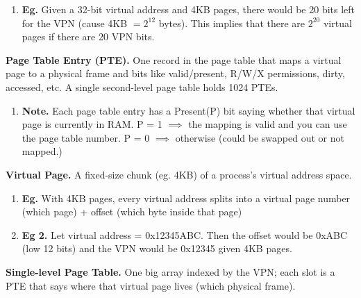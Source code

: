 \documentclass[12pt]{article}
\begin{document}
    \begin{enumerate}
        \item[]{\bf Eg.} {Given a 32-bit virtual address and 4KB pages, there would be 20 bits left for the VPN (cause 4KB $= 2^{12}$ bytes). This implies that there are $2^{20}$ virtual pages if there are 20 VPN bits.} \par 
    \end{enumerate}
    \vspace{1em}

    \setlength{\parindent}{0pt} 
    {\bf Page Table Entry (PTE).} {One record in the page table that maps a virtual page to a physical frame and bits like valid/present, R/W/X permissions, dirty, accessed, etc. A single second-level page table holds 1024 PTEs.} \par
    
    \begin{enumerate}
        \item[]{\bf Note.} {Each page table entry has a Present(P) bit saying whether that virtual page is currently in RAM. P = 1 $\implies$ the mapping is valid and you can use the page table number. P = 0 $\implies$ otherwise (could be swapped out or not mapped.)}
    \end{enumerate}

\vspace{1em}
    {\bf Virtual Page.} {A fixed-size chunk (eg. 4KB) of a process's virtual address space.}
    \setlength{\parindent}{15pt} \par

    \begin{enumerate}
        \item[]{\bf Eg.} {With 4KB pages, every virtual address splits into a virtual page number (which page) + offset (which byte inside that page)} \par

        \item[]{\bf Eg 2.} {Let virtual address = 0x12345ABC. Then the offset would be 0xABC (low 12 bits) and the VPN would be 0x12345 given 4KB pages.} 
    \end{enumerate}

\vspace{1em}
\setlength{\parindent}{0pt} 

    {\bf Single-level Page Table.} {One big array indexed by the VPN; each slot is a PTE that says where that virtual page lives (which physical frame).} \par
\end{document}
